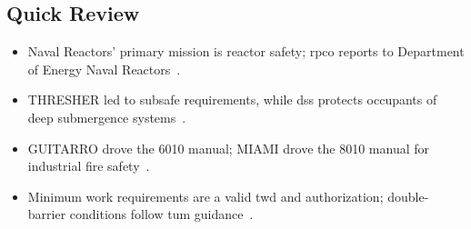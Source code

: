 \documentclass[../main.tex]{subfiles}
\begin{document}
\subsection{Quick Review}
\begin{itemize}
  \item Naval Reactors' primary mission is reactor safety; \ac{rpco} reports to Department of Energy Naval Reactors~\autocite{edo-4-1-5-waterfront-work-control-2025}.
  \item THRESHER led to \ac{subsafe} requirements, while \ac{dss} protects occupants of deep submergence systems~\autocite{edo-4-1-5-waterfront-work-control-2025}.
  \item GUITARRO drove the 6010 manual; MIAMI drove the 8010 manual for industrial fire safety~\autocite{edo-4-1-5-waterfront-work-control-2025,S9002-AK-CCM-010-6010,S0570-AC-CCM-010-8010}.
  \item Minimum work requirements are a valid \ac{twd} and authorization; double-barrier conditions follow \ac{tum} guidance~\autocite{edo-4-1-5-waterfront-work-control-2025,S0400-AD-URM-010}.
\end{itemize}

\end{document}
